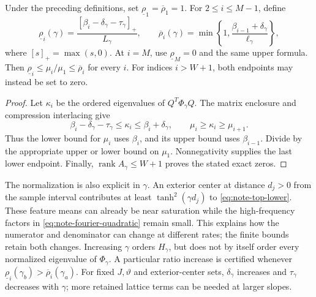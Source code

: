 \begin{theorem}
\label{thm:note-rates}
Under the preceding definitions, set
$\underline\rho_1=\overline\rho_1=1$. For $2\le i\le M-1$, define
\begin{equation}
 \underline\rho_i(\gamma)
 =\frac{[\beta_i-\delta_\gamma-\tau_\gamma]_+}{L_\gamma},\qquad
 \overline\rho_i(\gamma)
 =\min\!\left\{1,\frac{\beta_{i-1}+\delta_\gamma}{\ell_\gamma}\right\},
 \label{eq:note-ratio-interval}
\end{equation}
where $[s]_+=\max(s,0)$. At $i=M$, use
$\underline\rho_M=0$ and the same upper formula.
Then $\underline\rho_i\le\mu_i/\mu_1\le\overline\rho_i$ for every $i$.
For indices $i>W+1$, both endpoints may instead be set to zero.
\end{theorem}
\begin{proof}
Let $\kappa_i$ be the ordered eigenvalues of $Q^T\Phi_\gamma Q$.
The matrix enclosure and compression interlacing give
\[
 \beta_i-\delta_\gamma-\tau_\gamma\le\kappa_i
 \le\beta_i+\delta_\gamma,\qquad
 \mu_i\ge\kappa_i\ge\mu_{i+1}.
\]
Thus the lower bound for $\mu_i$ uses $\beta_i$, and its upper bound uses
$\beta_{i-1}$. Divide by the appropriate upper or lower bound on $\mu_1$.
Nonnegativity supplies the last lower endpoint. Finally,
$\operatorname{rank}A_\gamma\le W+1$ proves the stated exact zeros.
\end{proof}

The normalization is also explicit in $\gamma$.
An exterior center at distance $d_j>0$ from the sample interval contributes
at least $\tanh^2(\gamma d_j)$ to \eqref{eq:note-top-lower}.
These feature means can already be near saturation while the
high-frequency factors in \eqref{eq:note-fourier-quadratic} remain small.
This explains how the numerator and denominator can change at different
rates; the finite bounds retain both changes. Increasing $\gamma$ orders
$H_\gamma$, but does not by itself order every normalized eigenvalue of
$\Phi_\gamma$. A particular ratio increase is certified whenever
$\underline\rho_i(\gamma_b)>\overline\rho_i(\gamma_a)$.
For fixed $J,\vartheta$ and exterior-center sets, $\delta_\gamma$ increases
and $\tau_\gamma$ decreases with $\gamma$; more retained lattice terms can
be needed at larger slopes.

